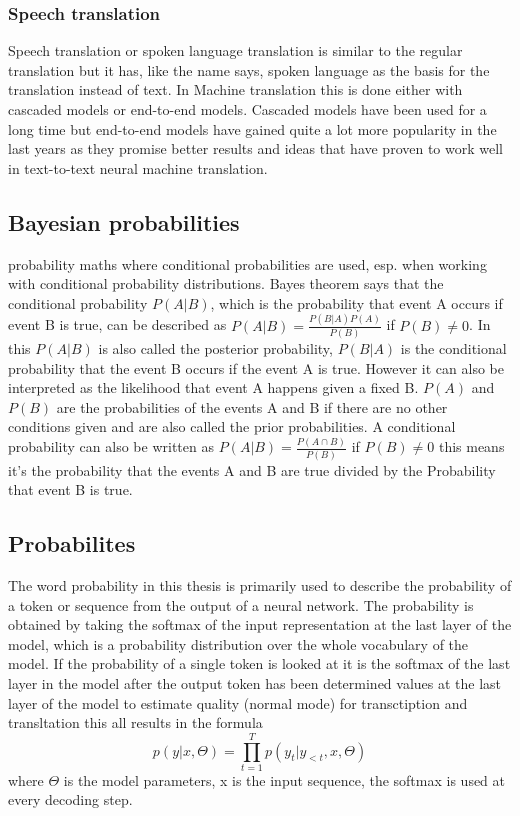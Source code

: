 \subsubsection{Speech translation}
Speech translation or spoken language translation is similar to the regular translation but it has, like the name says, spoken language as the basis for the translation instead of text. 
In Machine translation this is done either with cascaded models or end-to-end models.
Cascaded models have been used for a long time but end-to-end models have gained quite a lot more popularity in the last years as they promise better results and ideas that have proven to work well in text-to-text neural machine translation.


\subsection{Bayesian probabilities}
probability maths where conditional probabilities are used, esp. when working with conditional probability distributions.
Bayes theorem says that the conditional probability $P(A|B)$, which is the probability that event A occurs if event B is true, can be described as $P(A|B)=\frac{P(B|A)P(A)}{P(B)}$ if $P(B)\neq0$. 
In this $P(A|B)$ is also called the posterior probability, $P(B|A)$ is the conditional probability that the event B occurs if the event A is true. 
However it can also be interpreted as the likelihood that event A happens given a fixed B. 
$P(A)$ and $P(B)$ are the probabilities of the events A and B if there are no other conditions given and are also called the prior probabilities. 
A conditional probability can also be written as $P(A|B)=\frac{P(A\cap B)}{P(B)}$ if $P(B)\neq0$ this means it's the probability that the events A and B are true divided by the Probability that event B is true.


\subsection{Probabilites}
The word probability in this thesis is primarily used to describe the probability of a token or sequence from the output of a neural network.
The probability is obtained by taking the softmax of the input representation at the last layer of the model, which is a probability distribution over the whole vocabulary of the model. 
If the probability of a single token is looked at it is the softmax of the last layer in the model after the output token has been determined 
values at the last layer of the model to estimate quality (normal mode) for transctiption and transltation 
this all results in the formula $$p(y|x,\Theta)=\prod_{t=1}^T p(y_t|y_{<t}, x, \Theta) $$ where $\Theta$ is the model parameters, x is the input sequence, the softmax is used at every decoding step.

